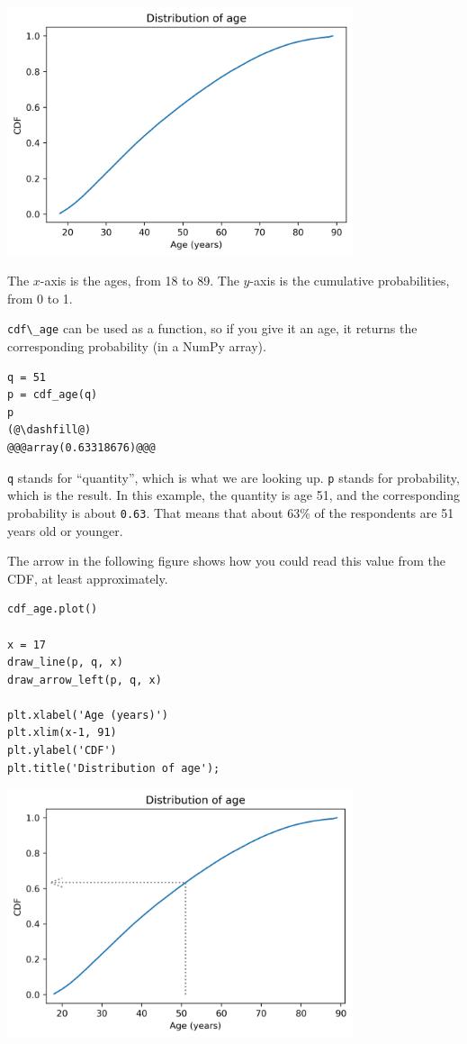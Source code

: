 \begin{center}
\includegraphics[width=4in]{chapters/08_distributions_files/08_distributions_66_0.png}
\end{center}

The \(x\)-axis is the ages, from 18 to 89. The \(y\)-axis is the
cumulative probabilities, from 0 to 1.

\passthrough{\lstinline!cdf\_age!} can be used as a function, so if you
give it an age, it returns the corresponding probability (in a NumPy
array).

\begin{lstlisting}[]
q = 51
p = cdf_age(q)
p
(@\dashfill@)
@@@array(0.63318676)@@@
\end{lstlisting}

\passthrough{\lstinline!q!} stands for ``quantity'', which is what we
are looking up. \passthrough{\lstinline!p!} stands for probability,
which is the result. In this example, the quantity is age 51, and the
corresponding probability is about \passthrough{\lstinline!0.63!}. That
means that about 63\% of the respondents are 51 years old or younger.

The arrow in the following figure shows how you could read this value
from the CDF, at least approximately.

\begin{lstlisting}[]
cdf_age.plot()

x = 17
draw_line(p, q, x)
draw_arrow_left(p, q, x)

plt.xlabel('Age (years)')
plt.xlim(x-1, 91)
plt.ylabel('CDF')
plt.title('Distribution of age');
\end{lstlisting}

\begin{center}
\includegraphics[width=4in]{chapters/08_distributions_files/08_distributions_71_0.png}
\end{center}

